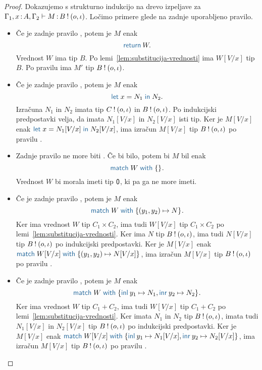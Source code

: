 \begin{proof}
	Dokazujemo s strukturno indukcijo na drevo izpeljave za $\Gamma_1, x \mathinner{:} A, \Gamma_2 \vdash M \mathinner{:} B \mathbin{!} (o, \iota)$.
	Ločimo primere glede na zadnje uporabljeno pravilo.
	
	\begin{itemize}
		\item Če je zadnje pravilo , potem je $M$ enak $$\tmreturn{W}.$$
		Vrednost $W$ ima tip $B$.
		Po lemi~\ref{lem:substitucija-vrednosti} ima $W[V/x]$ tip $B$.
		Po pravilu  ima $M'$ tip $B \mathbin{!} (o, \iota)$.
		
		\item Če je zadnje pravilo , potem je $M$ enak $$\tmlet{x}{N_1}{N_2}.$$
		Izračuna $N_1$ in $N_2$ imata tip $C \mathbin{!} (o, \iota)$ in $B \mathbin{!} (o, \iota)$.
		Po indukcijski predpostavki velja, da imata $N_1[V/x]$ in $N_2[V/x]$ isti tip.
		Ker je $M[V/x]$ enak $\tmlet{x}{N_1[V/x]}{N_2[V/x]}$, ima izračun $M[V/x]$ tip $B \mathbin{!} (o, \iota)$ po pravilu .
		
		\item Zadnje pravilo ne more biti . Če bi bilo, potem bi $M$ bil enak $$\tmmatch{W}{}.$$
		Vrednost $W$ bi morala imeti tip $\mathsf{0}$, ki pa ga ne more imeti. 
		
		\item Če je zadnje pravilo , potem je $M$ enak $$\tmmatch{W}{(y_1,y_2) \mapsto N}.$$ 
		Ker ima vrednost $W$ tip $C_1 \times C_2$, ima tudi $W[V/x]$ tip $C_1 \times C_2$ po lemi~\ref{lem:substitucija-vrednosti}.
		Ker ima $N$ tip $B \mathbin{!} (o, \iota)$, ima tudi $N[V/x]$ tip $B \mathbin{!} (o, \iota)$ po indukcijski predpostavki.
		Ker je $M[V/x]$ enak $\tmmatch{W[V/x]}{(y_1,y_2) \mapsto N[V/x]}$, ima izračun $M[V/x]$ tip $B \mathbin{!} (o, \iota)$ po pravilu . 
		
		\item Če je zadnje pravilo , potem je $M$ enak $$\tmmatch{W}{\tminl{y_1} \mapsto N_1, \tminr{y_2} \mapsto N_2}.$$
		Ker ima vrednost $W$ tip $C_1 + C_2$, ima tudi $W[V/x]$ tip $C_1 + C_2$ po lemi~\ref{lem:substitucija-vrednosti}.
		Ker imata $N_1$ in $N_2$ tip $B \mathbin{!} (o, \iota)$, imata tudi $N_1[V/x]$ in $N_2[V/x]$ tip $B \mathbin{!} (o, \iota)$ po indukcijski predpostavki.
		Ker je $M[V/x]$ enak $\tmmatch{W[V/x]}{\tminl{y_1} \mapsto N_1[V/x], \tminr{y_2} \mapsto N_2[V/x]}$, ima izračun $M[V/x]$ tip $B \mathbin{!} (o, \iota)$ po pravilu .
		

\end{itemize}
\end{proof}
